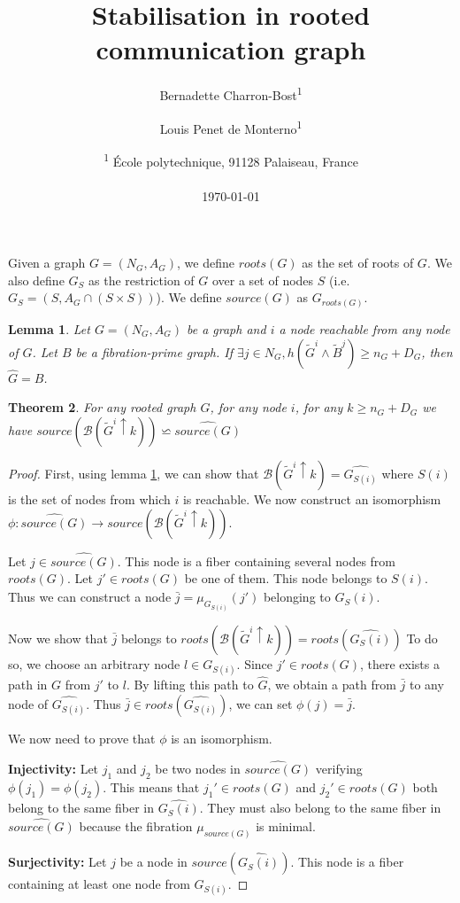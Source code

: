 \documentclass[11pt,letterpaper]{article}
\title{Stabilisation in rooted communication graph}
\author{Bernadette Charron-Bost\textsuperscript{1} \and Louis Penet de Monterno\textsuperscript{1}}
\date{\textsuperscript{1} \'Ecole polytechnique, 91128 Palaiseau, France\\~\\ \today}
\newtheorem{thm}{Theorem}
\newtheorem{lem}[thm]{Lemma}
\begin{document}
\maketitle

Given a graph $G = (N_G, A_G)$, we define $roots(G)$ as the set of roots of $G$.
We also define $G_S$ as the restriction of $G$ over a set of nodes $S$ (i.e. $G_S = (S, A_G \cap (S \times S))$).
We define $source(G)$ as $G_{roots(G)}$.


\begin{lem} \label{lem:safB} 
	Let $G = (N_G, A_G)$ be a graph and $i$ a node reachable from any node of $G$.
	Let $B$ be a fibration-prime graph.
	If $\exists j \in N_G, h(\tilde{G}^i \wedge \tilde{B}^j) \geq n_G + D_G$, then $\hat G = B$.
\end{lem}

\begin{thm}
	For any rooted graph $G$, for any node $i$, for any $k \geq n_G + D_G$ we have $source(\mathcal{B}(\tilde{G}^i \uparrow k)) \backsimeq \widehat{source(G)}$
\end{thm}
\begin{proof}
	First, using lemma \ref{lem:safB}, we can show that $\mathcal{B}(\tilde{G}^i \uparrow k) = \widehat{G_{S(i)}}$ where $S(i)$ is the set of nodes from which $i$ is reachable.
	We now construct an isomorphism $\phi : \widehat{source(G)} \rightarrow source(\mathcal{B}(\tilde{G}^i \uparrow k))$.

	Let $j \in \widehat{source(G)}$.
	This node is a fiber containing several nodes from $roots(G)$.
	Let $j' \in roots(G)$ be one of them. This node belongs to $S(i)$.
	Thus we can construct a node $\bar j = \mu_{G_{S(i)}}(j')$ belonging to $\widehat{G_S(i)}$.

	Now we show that $\bar j$ belongs to $roots(\mathcal{B}(\tilde{G}^i \uparrow k)) = roots(\widehat{G_S(i)})$
	To do so, we  choose an arbitrary node $l \in G_{S(i)}$.
	Since $j' \in roots(G)$, there exists a path in $G$ from $j'$ to $l$.
	By lifting this path to $\hat G$, we obtain a path from $\bar j$ to any node of $\widehat{G_{S(i)}}$.
	Thus $\bar j \in roots(\widehat{G_{S(i)}})$, we can set $\phi(j) = \bar j$.

	We now need to prove that $\phi$ is an isomorphism.

	\noindent \textbf{Injectivity: } Let $j_1$ and $j_2$ be two nodes in $\widehat{source(G)}$ verifying $\phi(j_1) = \phi(j_2)$.
	This means that $j_1' \in roots(G)$ and $j_2' \in roots(G)$ both belong to the same fiber in $\widehat{G_S(i)}$.
	They must also belong to the same fiber in $\widehat{source(G)}$ because the fibration $\mu_{source(G)}$ is minimal.

	\noindent \textbf{Surjectivity: } Let $j$ be a node in $source(\widehat{G_S(i)})$.
	This node is a fiber containing at least one node from $G_{S(i)}$.

\end{proof}
\end{document}
